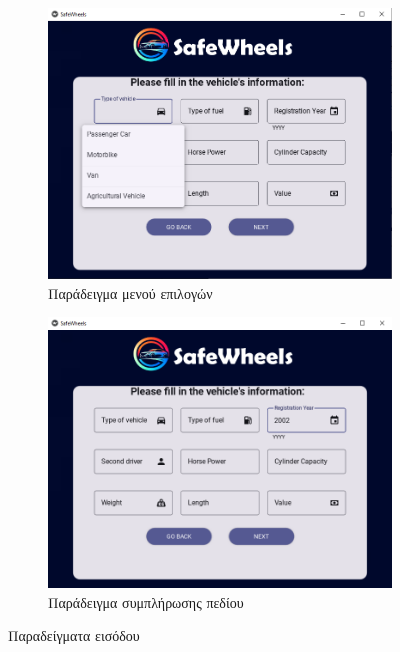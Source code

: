 \documentclass{llncs}
\begin{document}
\begin{figure}
    \centering
    \begin{subfigure}{0.45\linewidth}
        \includegraphics[width=\linewidth]{images/vehicle_type.png}
        \caption{Παράδειγμα μενού επιλογών}
        \label{fig:type}
    \end{subfigure}
    \begin{subfigure}{0.45\linewidth}
        \includegraphics[width=\linewidth]{images/vehicle_reg_year.png}
        \caption{Παράδειγμα συμπλήρωσης πεδίου}
        \label{fig:reg}
    \end{subfigure}
    \caption{Παραδείγματα εισόδου}
    \label{fig:vehicle_examples}
\end{figure}
\end{document}
